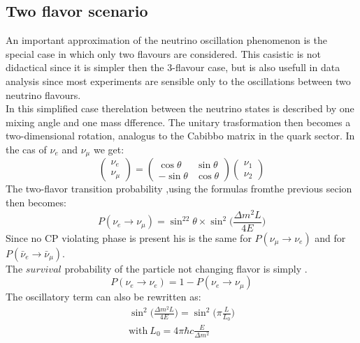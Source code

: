 \documentclass[12pt,a4paper,openright,twoside]{report}
\begin{document}
\subsection{Two flavor scenario}   
An important approximation of the neutrino oscillation phenomenon is the special case in which only two flavours are considered. This casistic is not didactical since it is simpler then the 3-flavour case, but is also usefull in data analysis since most experiments are sensible only to the oscillations between two neutrino flavours.\\
In this simplified case therelation between the neutrino states is described by one mixing angle and one mass dfference. The unitary trasformation then becomes a two-dimensional rotation, analogus to the Cabibbo matrix in the quark sector. In the cas of $\nu_e$ and $\nu_\mu$ we get:
\begin{equation}
\begin{pmatrix}
\nu_e \\ 
\nu_\mu
\end{pmatrix}
=
\begin{pmatrix}
\cos\theta & \sin\theta \\ 
-\sin\theta & \cos\theta
\end{pmatrix}
\begin{pmatrix}
\nu_1 \\ 
\nu_2
\end{pmatrix}
\end{equation}
The two-flavor transition probability ,using the formulas fromthe previous secion then becomes:
\begin{equation}
P(\nu_e\rightarrow \nu_\mu) = \sin^22\theta \times \sin^2\bigg( \frac{\Delta m^2L}{4E}\bigg)
\end{equation}
Since no CP violating phase is present his is the same for $P(\nu_\mu\rightarrow \nu_e)$ and for $P(\bar{\nu}_e\rightarrow \bar{\nu}_\mu)$.\\
The $survival$ probability of the particle not changing flavor is simply .
\begin{equation}
P(\nu_e\rightarrow \nu_e)=1-P(\nu_e\rightarrow \nu_\mu)
\end{equation}
The oscillatory term can also be rewritten as:
\begin{equation}
\begin{split}
\sin^2\bigg( \frac{\Delta m^2L}{4E}\bigg)=\sin^2\bigg(\pi \frac{L}{L_0}\bigg) \\[8 pt]
\text{with} \ L_0=4\pi \hbar c\frac{E}{\Delta m^2}
\end{split}
\end{equation}
\end{document}
